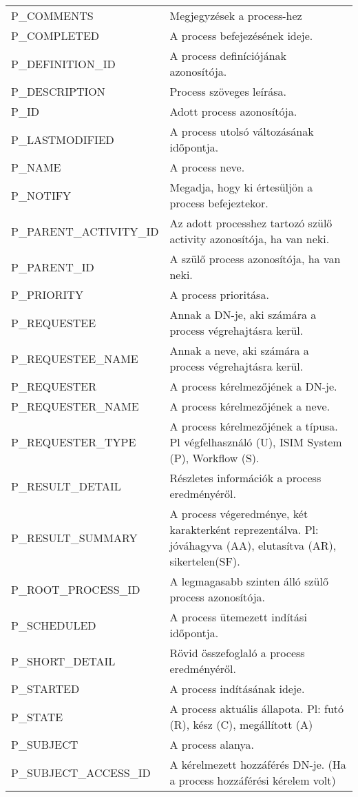 \begin{longtable}{lp{10cm}}
		P\_COMMENTS & Megjegyzések a process-hez \\
		P\_COMPLETED & A process befejezésének ideje. \\
		P\_DEFINITION\_ID & A process definíciójának azonosítója. \\
		P\_DESCRIPTION & Process szöveges leírása. \\
		P\_ID & Adott process azonosítója. \\
		P\_LASTMODIFIED & A process utolsó változásának időpontja. \\
		P\_NAME & A process neve. \\
		P\_NOTIFY & Megadja, hogy ki értesüljön a process befejeztekor. \\
		P\_PARENT\_ACTIVITY\_ID & Az adott processhez tartozó szülő activity azonosítója, ha van neki. \\
		P\_PARENT\_ID & A szülő process azonosítója, ha van neki. \\
		P\_PRIORITY & A process prioritása. \\
		P\_REQUESTEE & Annak a DN-je, aki számára a process végrehajtásra kerül. \\
		P\_REQUESTEE\_NAME & Annak a neve, aki számára a process végrehajtásra kerül. \\
		P\_REQUESTER & A process kérelmezőjének a DN-je. \\
		P\_REQUESTER\_NAME & A process kérelmezőjének a neve. \\
		P\_REQUESTER\_TYPE & A process kérelmezőjének a típusa. Pl végfelhasználó (U), ISIM System (P), Workflow (S). \\
		P\_RESULT\_DETAIL & Részletes információk a process eredményéről. \\
		P\_RESULT\_SUMMARY & A process végeredménye, két karakterként reprezentálva. Pl: jóváhagyva (AA), elutasítva (AR), sikertelen(SF). \\
		P\_ROOT\_PROCESS\_ID & A legmagasabb szinten álló szülő process azonosítója. \\
		P\_SCHEDULED & A process ütemezett indítási időpontja. \\
		P\_SHORT\_DETAIL & Rövid összefoglaló a process eredményéről. \\
		P\_STARTED & A process indításának ideje. \\
		P\_STATE & A process aktuális állapota. Pl: futó (R), kész (C), megállított (A) \\
		P\_SUBJECT & A process alanya. \\
		P\_SUBJECT\_ACCESS\_ID & A kérelmezett hozzáférés DN-je. (Ha a process hozzáférési kérelem volt) \\

\end{longtable}
